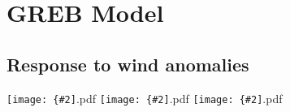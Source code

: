 \documentclass[12pt,a4paper]{article}
\newcommand{\pdffig}[2][0.5]{\texttt{[image: \{\#2]}.pdf}}
\begin{document}
\section{GREB Model}
\subsection{Response to wind anomalies}


\pdffig[0.5]{t_surf.v_anom.pos.response}
\pdffig[0.5]{t_surf.u_anom.pos.response}
\pdffig[0.5]{t_surf.uv_anom.pos.response}
\end{document}

